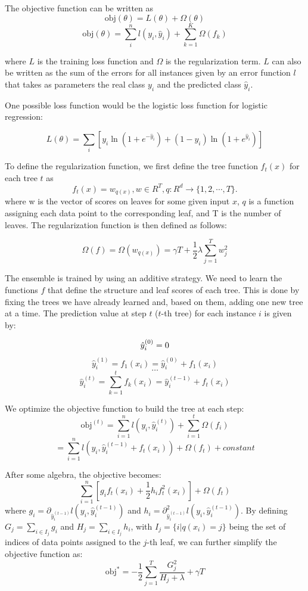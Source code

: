 \documentclass[cic,tc,english]{iiufrgs}
\begin{document}
The objective function can be written as
$$\text{obj}(\theta) = L(\theta) + \Omega(\theta)$$
$$\text{obj}(\theta) = \sum_i^n l(y_i, \hat{y}_i) + \sum_{k=1}^K \Omega(f_k)$$

\noindent where $L$ is the training loss function and $\Omega$ is the regularization term. $L$ can also be written as the sum of the errors for all instances given by an error function $l$ that takes as parameters the real class $y_i$ and the predicted class $\hat{y}_i$.

One possible loss function would be the logistic loss function for logistic regression:

$$L(\theta) = \sum_i[ y_i\ln (1+e^{-\hat{y}_i}) + (1-y_i)\ln (1+e^{\hat{y}_i})]$$

To define the regularization function, we first define the tree function $f_t(x)$ for each tree $t$ as
$$
f_t(x) = w_{q(x)}, w \in R^T, q:R^d\rightarrow \{1,2,\cdots,T\} .
$$
\noindent where w is the vector of scores on leaves for some given input $x$, $q$ is a function assigning each data point to the corresponding leaf, and T is the number of leaves. The regularization function is then defined as follows: 

$$\Omega(f) = \Omega(w_{q(x)}) = \gamma T + \frac{1}{2}\lambda \sum_{j=1}^T w_j^2$$


The ensemble is trained by using an additive strategy. We need to learn the functions $f$ that define the structure and leaf scores of each tree. This is done by fixing the trees we have already learned and, based on them, adding one new tree at a time. The prediction value at step $t$ ($t$-th tree) for each instance $i$ is given by:

$$
\hat{y}_i^{(0)} = 0\\
$$
$$
\hat{y}_i^{(1)} = f_1(x_i) = \hat{y}_i^{(0)} + f_1(x_i)
$$
$$
\dots
$$
$$
\hat{y}_i^{(t)} = \sum_{k=1}^t f_k(x_i)= \hat{y}_i^{(t-1)} + f_t(x_i)
$$

We optimize the objective function to build the tree at each step: 
$$
\text{obj}^{(t)} = \sum_{i=1}^n l(y_i, \hat{y}_i^{(t)}) + \sum_{i=1}^t\Omega(f_i)
$$
$$
= \sum_{i=1}^n l(y_i, \hat{y}_i^{(t-1)} + f_t(x_i)) + \Omega(f_t) + constant
$$

After some algebra, the objective becomes:
$$
\sum_{i=1}^n [g_i f_t(x_i) + \frac{1}{2} h_i f_t^2(x_i)] + \Omega(f_t)
$$
\noindent where $g_i = \partial_{\hat{y}_i^{(t-1)}} l(y_i, \hat{y}_i^{(t-1)})$ and $h_i = \partial_{\hat{y}_i^{(t-1)}}^2 l(y_i, \hat{y}_i^{(t-1)})$. By defining $G_j = \sum_{i\in I_j} g_i$ and $H_j = \sum_{i\in I_j} h_i$, with $I_j = \{i|q(x_i)=j\}$ being the set of indices of data points assigned to the $j$-th leaf, we can further simplify the objective function as:
$$
\text{obj}^\ast = -\frac{1}{2} \sum_{j=1}^T \frac{G_j^2}{H_j+\lambda} + \gamma T
$$
\end{document}
